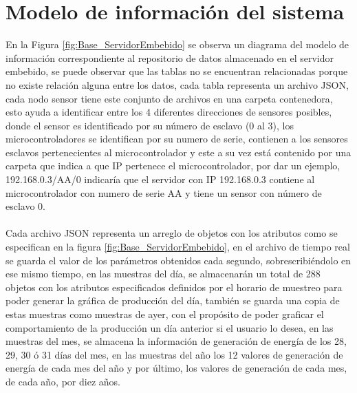\section{Modelo de información del sistema}
En la Figura \ref{fig:Base_ServidorEmbebido} se observa un diagrama del modelo de información correspondiente al repositorio de datos almacenado en el servidor embebido, se puede observar que las tablas no se encuentran relacionadas porque no existe relación alguna entre los datos, cada tabla representa un archivo JSON, cada nodo sensor tiene este conjunto de archivos en una carpeta contenedora, esto ayuda a identificar entre los 4 diferentes direcciones de sensores posibles, donde el sensor es identificado por su número de esclavo (0 al 3), los microcontroladores se identifican por su numero de serie, contienen a los sensores esclavos pertenecientes al microcontrolador y este a su vez está contenido por una carpeta que indica a que IP pertenece el microcontrolador, por dar un ejemplo, 192.168.0.3/AA/0 indicaría que el servidor con IP 192.168.0.3 contiene al microcontrolador con numero de serie AA y tiene un sensor con número de esclavo 0. 
\paragraph{}
Cada archivo JSON representa un arreglo de objetos con los atributos como se especifican en la figura \ref{fig:Base_ServidorEmbebido}, en el archivo de tiempo real se guarda el valor de los parámetros obtenidos cada segundo, sobrescribiéndolo en ese mismo tiempo, en las muestras del día, se almacenarán un total de 288 objetos con los atributos especificados definidos por el horario de muestreo para poder generar la gráfica de producción del día, también se guarda una copia de estas muestras como muestras de ayer, con el propósito de poder graficar el comportamiento de la producción un día anterior si el usuario lo desea, en las muestras del mes, se almacena la información de generación de energía de los 28, 29, 30 ó 31 días del mes, en las muestras del año los 12 valores de generación de energía de cada mes del año y por último, los valores de generación de cada mes, de cada año, por diez años.

